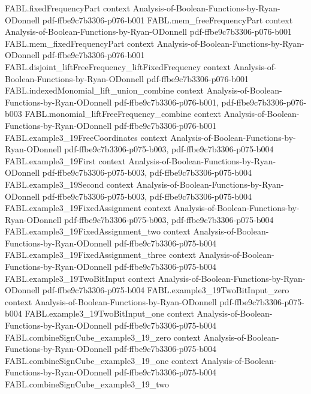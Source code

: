 \begin{theorem}
  {FABL.fixedFrequencyPart}
  {context}
  {Analysis-of-Boolean-Functions-by-Ryan-ODonnell}
  {pdf-ffbe9c7b3306-p076-b001}
\proofstep
  {FABL.mem_freeFrequencyPart}
  {context}
  {Analysis-of-Boolean-Functions-by-Ryan-ODonnell}
  {pdf-ffbe9c7b3306-p076-b001}
\proofstep
  {FABL.mem_fixedFrequencyPart}
  {context}
  {Analysis-of-Boolean-Functions-by-Ryan-ODonnell}
  {pdf-ffbe9c7b3306-p076-b001}
\proofstep
  {FABL.disjoint_liftFreeFrequency_liftFixedFrequency}
  {context}
  {Analysis-of-Boolean-Functions-by-Ryan-ODonnell}
  {pdf-ffbe9c7b3306-p076-b001}
\proofstep
  {FABL.indexedMonomial_lift_union_combine}
  {context}
  {Analysis-of-Boolean-Functions-by-Ryan-ODonnell}
  {pdf-ffbe9c7b3306-p076-b001,
    pdf-ffbe9c7b3306-p076-b003}
\proofstep
  {FABL.monomial_liftFreeFrequency_combine}
  {context}
  {Analysis-of-Boolean-Functions-by-Ryan-ODonnell}
  {pdf-ffbe9c7b3306-p076-b001}
\proofstep
  {FABL.example3_19FreeCoordinates}
  {context}
  {Analysis-of-Boolean-Functions-by-Ryan-ODonnell}
  {pdf-ffbe9c7b3306-p075-b003,
    pdf-ffbe9c7b3306-p075-b004}
\proofstep
  {FABL.example3_19First}
  {context}
  {Analysis-of-Boolean-Functions-by-Ryan-ODonnell}
  {pdf-ffbe9c7b3306-p075-b003,
    pdf-ffbe9c7b3306-p075-b004}
\proofstep
  {FABL.example3_19Second}
  {context}
  {Analysis-of-Boolean-Functions-by-Ryan-ODonnell}
  {pdf-ffbe9c7b3306-p075-b003,
    pdf-ffbe9c7b3306-p075-b004}
\proofstep
  {FABL.example3_19FixedAssignment}
  {context}
  {Analysis-of-Boolean-Functions-by-Ryan-ODonnell}
  {pdf-ffbe9c7b3306-p075-b003,
    pdf-ffbe9c7b3306-p075-b004}
\proofstep
  {FABL.example3_19FixedAssignment_two}
  {context}
  {Analysis-of-Boolean-Functions-by-Ryan-ODonnell}
  {pdf-ffbe9c7b3306-p075-b004}
\proofstep
  {FABL.example3_19FixedAssignment_three}
  {context}
  {Analysis-of-Boolean-Functions-by-Ryan-ODonnell}
  {pdf-ffbe9c7b3306-p075-b004}
\proofstep
  {FABL.example3_19TwoBitInput}
  {context}
  {Analysis-of-Boolean-Functions-by-Ryan-ODonnell}
  {pdf-ffbe9c7b3306-p075-b004}
\proofstep
  {FABL.example3_19TwoBitInput_zero}
  {context}
  {Analysis-of-Boolean-Functions-by-Ryan-ODonnell}
  {pdf-ffbe9c7b3306-p075-b004}
\proofstep
  {FABL.example3_19TwoBitInput_one}
  {context}
  {Analysis-of-Boolean-Functions-by-Ryan-ODonnell}
  {pdf-ffbe9c7b3306-p075-b004}
\proofstep
  {FABL.combineSignCube_example3_19_zero}
  {context}
  {Analysis-of-Boolean-Functions-by-Ryan-ODonnell}
  {pdf-ffbe9c7b3306-p075-b004}
\proofstep
  {FABL.combineSignCube_example3_19_one}
  {context}
  {Analysis-of-Boolean-Functions-by-Ryan-ODonnell}
  {pdf-ffbe9c7b3306-p075-b004}
\proofstep
  {FABL.combineSignCube_example3_19_two}

\end{theorem}
